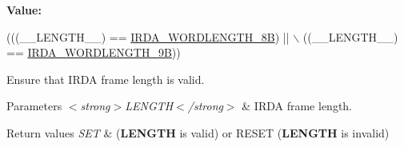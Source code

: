 {\bfseries Value\+:}
\begin{DoxyCode}
(((\_\_LENGTH\_\_) == \hyperlink{group___i_r_d_a_ex___word___length_ga53b28028ae932349fcc40190dd8d7c9a}{IRDA\_WORDLENGTH\_8B}) || \(\backslash\)
                                         ((\_\_LENGTH\_\_) == \hyperlink{group___i_r_d_a_ex___word___length_gad005e4d28476758d4e5b56a3d98f7cd4}{IRDA\_WORDLENGTH\_9B}))
\end{DoxyCode}


Ensure that I\+R\+DA frame length is valid. 


\begin{DoxyParams}{Parameters}
{\em $<$strong$>$\+L\+E\+N\+G\+T\+H$<$/strong$>$} & I\+R\+DA frame length. \\
\hline
\end{DoxyParams}

\begin{DoxyRetVals}{Return values}
{\em S\+ET} & ({\bfseries L\+E\+N\+G\+TH} is valid) or R\+E\+S\+ET ({\bfseries L\+E\+N\+G\+TH} is invalid) \\
\hline
\end{DoxyRetVals}
